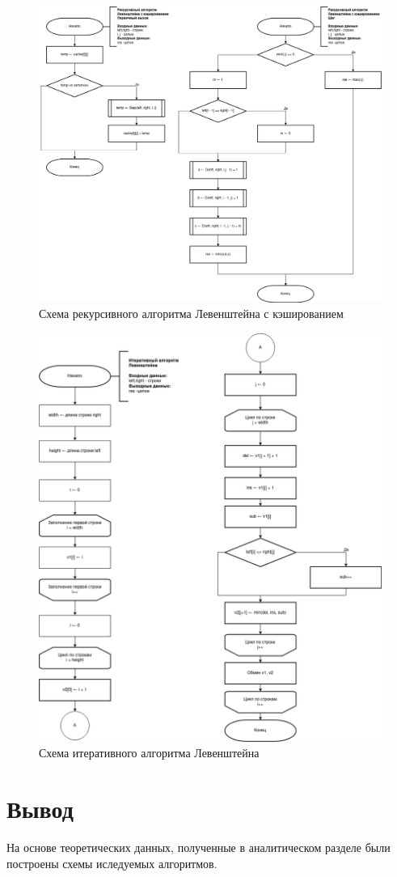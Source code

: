 \begin{figure}[h]
    \centering
    \includegraphics[width=1\columnwidth]{img/flowcharts/2.png}
    \caption{Схема рекурсивного алгоритма Левенштейна с кэшированием}
    \label{fig:scheme_algo_cache}
\end{figure} 

\begin{figure}[h]
    \centering
    \includegraphics[width=1\columnwidth]{img/flowcharts/3.png}
    \caption{Схема итеративного алгоритма Левенштейна}
    \label{fig:scheme_algo_iterative}
\end{figure} 


\clearpage
\section{Вывод}
На основе теоретических данных, полученные в аналитическом разделе были построены схемы иследуемых алгоритмов.

